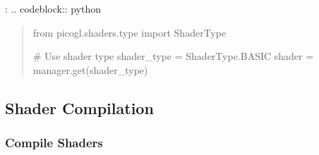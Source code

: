 \documentclass[a4paper,10pt,english,openany,oneside]{sphinxmanual}
\begin{document}
\sphinxAtStartPar
{}:
.. code\sphinxhyphen{}block:: python
\begin{quote}

\sphinxAtStartPar
from picogl.shaders.type import ShaderType

\sphinxAtStartPar
\# Use shader type
shader\_type = ShaderType.BASIC
shader = manager.get(shader\_type)
\end{quote}


\subsection{Shader Compilation}
\label{\detokenize{api/shaders:shader-compilation}}

\subsubsection{Compile Shaders}
\label{\detokenize{api/shaders:compile-shaders}}
\end{document}
